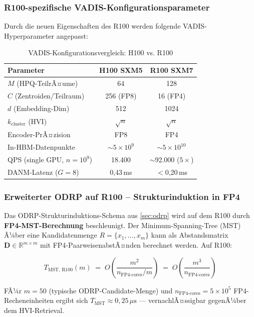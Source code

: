 ﻿\documentclass[12pt,a4paper]{article}
\begin{document}
\subsubsection{R100-spezifische VADIS-Konfigurationsparameter}

Durch die neuen Eigenschaften des R100 werden folgende
VADIS-Hyperparameter angepasst:

\begin{table}[ht]
\centering
\small
\caption{VADIS-Konfigurationsvergleich: H100 vs. R100}
\label{tab:config_compare}
\begin{tabular}{@{}lcc@{}}
\toprule
\textbf{Parameter} & \textbf{H100 SXM5} & \textbf{R100 SXM7} \\
\midrule
$M$ (HPQ-TeilrÃ¤ume) & 64 & 128 \\
$C$ (Zentroiden/Teilraum) & 256 (FP8) & 16 (FP4) \\
$d$ (Embedding-Dim) & 512 & 1024 \\
$k_{\text{cluster}}$ (HVI) & $\sqrt{n}$ & $\sqrt{n}$ \\
Encoder-PrÃ¤zision & FP8 & FP4 \\
In-HBM-Datenpunkte & $\sim5\times10^9$ & $\sim5\times10^{10}$ \\
QPS (single GPU, $n=10^9$) & 18.400 & $\sim$92.000 ($5\times$) \\
DANM-Latenz ($G=8$) & 0,43\,ms & $<$0,20\,ms \\
\bottomrule
\end{tabular}
\end{table}

\subsubsection{Erweiterter ODRP auf R100 -- Strukturinduktion in FP4}

Das ODRP-Strukturinduktions-Schema aus \cref{sec:odrp}
wird auf dem R100 durch \textbf{FP4-MST-Berechnung} beschleunigt.
Der Minimum-Spanning-Tree (MST) Ã¼ber eine Kandidatenmenge
$R = \{x_1, \ldots, x_m\}$ kann als Abstandsmatrix
$\mathbf{D} \in \mathbb{R}^{m \times m}$ mit FP4-PaarweisenabstÃ¤nden
berechnet werden. Auf R100:

\begin{equation}
  T_{\text{MST, R100}}(m) \;=\; O\!\left(\frac{m^2}{n_{\text{FP4-cores}} / m}\right)
  \;=\; O\!\left(\frac{m^3}{n_{\text{FP4-cores}}}\right)
\end{equation}

FÃ¼r $m = 50$ (typische ODRP-Candidate-Menge) und
$n_{\text{FP4-cores}} = 5 \times 10^5$ FP4-Recheneinheiten
ergibt sich $T_{\text{MST}} \approx 0{,}25\,\mu\text{s}$
--- vernachlÃ¤ssigbar gegenÃ¼ber dem HVI-Retrieval.
\end{document}
